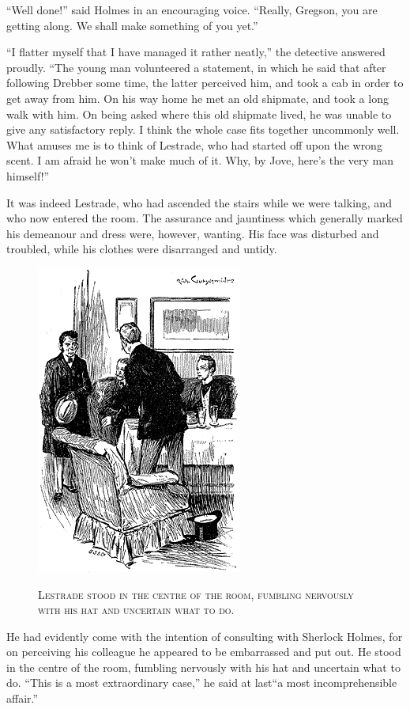 \documentclass[12pt,english]{book}
\newcommand{\noun}[1]{\textsc{#1}}
\begin{document}
{}``Well done!'' said Holmes in an encouraging voice. {}``Really,
Gregson, you are getting along. We shall make something of you yet.''

{}``I flatter myself that I have managed it rather neatly,'' the
detective answered proudly. {}``The young man volunteered a statement,
in which he said that after following Drebber some time, the latter
perceived him, and took a cab in order to get away from him. On his
way home he met an old shipmate, and took a long walk with him. On
being asked where this old shipmate lived, he was unable to give any
satisfactory reply. I think the whole case fits together uncommonly
well. What amuses me is to think of Lestrade, who had started off
upon the wrong scent. I am afraid he won't make much of it. Why, by
Jove, here's the very man himself!''

It was indeed Lestrade, who had ascended the stairs while we were
talking, and who now entered the room. The assurance and jauntiness
which generally marked his demeanour and dress were, however, wanting.
His face was disturbed and troubled, while his clothes were disarranged
and untidy. %
\begin{figure}[htbp]
\noindent \begin{center}\includegraphics{images/study10-stud-11.png}\end{center}

\noindent \begin{center}\noun{Lestrade stood in the centre of the
room, fumbling nervously with his hat and uncertain what to do.}\end{center}
\end{figure}
He had evidently come with the intention of consulting with Sherlock
Holmes, for on perceiving his colleague he appeared to be embarrassed
and put out. He stood in the centre of the room, fumbling nervously
with his hat and uncertain what to do. {}``This is a most extraordinary
case,'' he said at last\mdsh{---}{}``a most incomprehensible affair.''
\end{document}
